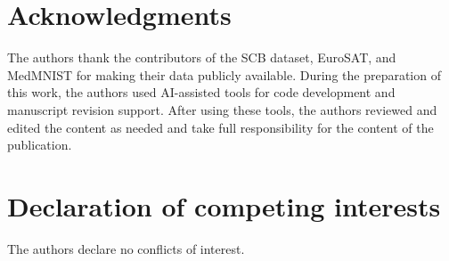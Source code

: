 \documentclass[a4paper,fleqn]{cas-sc}
\begin{document}
\section*{Acknowledgments}
The authors thank the contributors of the SCB dataset, EuroSAT, and MedMNIST for making their data publicly available. During the preparation of this work, the authors used AI-assisted tools for code development and manuscript revision support. After using these tools, the authors reviewed and edited the content as needed and take full responsibility for the content of the publication.

\section*{Declaration of competing interests}
The authors declare no conflicts of interest.




\end{document}
